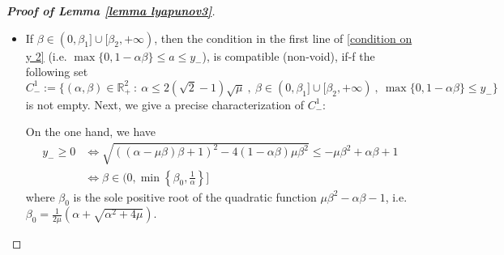 \documentclass[reqno]{amsart}
\theoremstyle{plain}
\theoremstyle{definition}
\theoremstyle{remark}
\newcommand{\R}{\mathbb{R}}	%
\newcommand{\Fb}{\mathcal{F}}
\begin{document}
\begin{proof}[\textbf{Proof of Lemma \ref{lemma lyapunov3}}]
\begin{itemize}[wide=0pt]
\begin{itemize}[wide=5pt]
			
%				
%				
%				
			
			\item[\textbf{-}] If $\beta\in (0,\beta_{1}]\cup[\beta_{2},+\infty)$,  then the condition in the first line of \eqref{condition on y 2} (i.e. $\max\{0,1-\alpha\beta\} \leq a \leq y_{-}$), is compatible (non-void), if-f the following set 
			\begin{equation}
				C^{1}_{-} := \{(\alpha,\beta)\in \R_{+}^{2}~:~\alpha\leq 2(\sqrt{2}-1)\sqrt\mu~,~ \beta\in (0,\beta_{1}]\cup[\beta_{2},+\infty) ~,~ \max\{0,1-\alpha\beta\} \leq y_{-} \}		
			\end{equation} is not empty. Next, we give a precise characterization of $C^{1}_{-}$:
			
			On the one hand, we have
			\begin{equation}\label{yminpositive1}
				\begin{aligned}
					y_{-}\geq 0 &\Leftrightarrow		\sqrt{\left((\alpha-\mu\beta)\beta+1\right)^2 - 4(1-\alpha\beta)\mu\beta^2} \leq -\mu\beta^{2}+\alpha\beta+1	\\
					& \Leftrightarrow 
					\beta \in \bigg(0,\min\left\{\beta_{0},\frac{1}{\alpha}\right\}\bigg]
				\end{aligned}
			\end{equation}
			where $\beta_{0}$ is the sole positive root of the quadratic function $\mu\beta^{2}-\alpha\beta-1$, i.e.  $\beta_{0}=\frac{1}{2\mu}\left(\alpha+\sqrt{\alpha^{2}+4\mu}\right)$.
			

\end{itemize}
\end{itemize}
\end{proof}
\end{document}
